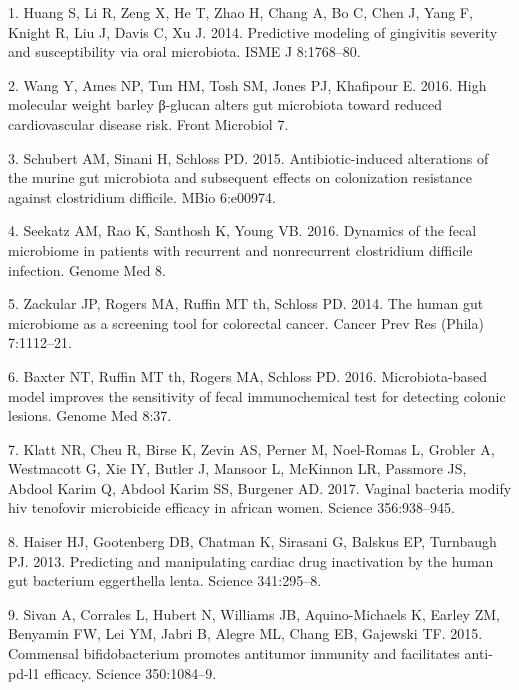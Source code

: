 \documentclass[12pt,]{article}
\begin{document}
\hypertarget{refs}{}
\hypertarget{ref-Huang_gingivitis_2014}{}
1. Huang S, Li R, Zeng X, He T, Zhao H, Chang A, Bo C, Chen J, Yang F,
Knight R, Liu J, Davis C, Xu J. 2014. Predictive modeling of gingivitis
severity and susceptibility via oral microbiota. ISME J 8:1768--80.

\hypertarget{ref-Wang_cvdrisk_2016}{}
2. Wang Y, Ames NP, Tun HM, Tosh SM, Jones PJ, Khafipour E. 2016. High
molecular weight barley β-glucan alters gut microbiota toward reduced
cardiovascular disease risk. Front Microbiol 7.

\hypertarget{ref-Schubert_cdiff_2015}{}
3. Schubert AM, Sinani H, Schloss PD. 2015. Antibiotic-induced
alterations of the murine gut microbiota and subsequent effects on
colonization resistance against clostridium difficile. MBio 6:e00974.

\hypertarget{ref-Seekatz_cdiff_2016}{}
4. Seekatz AM, Rao K, Santhosh K, Young VB. 2016. Dynamics of the fecal
microbiome in patients with recurrent and nonrecurrent clostridium
difficile infection. Genome Med 8.

\hypertarget{ref-zackular_CRC_2014}{}
5. Zackular JP, Rogers MA, Ruffin MT th, Schloss PD. 2014. The human gut
microbiome as a screening tool for colorectal cancer. Cancer Prev Res
(Phila) 7:1112--21.

\hypertarget{ref-baxter_FIT_2016}{}
6. Baxter NT, Ruffin MT th, Rogers MA, Schloss PD. 2016.
Microbiota-based model improves the sensitivity of fecal immunochemical
test for detecting colonic lesions. Genome Med 8:37.

\hypertarget{ref-Klatt_microbicide_2017}{}
7. Klatt NR, Cheu R, Birse K, Zevin AS, Perner M, Noel-Romas L, Grobler
A, Westmacott G, Xie IY, Butler J, Mansoor L, McKinnon LR, Passmore JS,
Abdool Karim Q, Abdool Karim SS, Burgener AD. 2017. Vaginal bacteria
modify hiv tenofovir microbicide efficacy in african women. Science
356:938--945.

\hypertarget{ref-Haiser_cardiac_2013}{}
8. Haiser HJ, Gootenberg DB, Chatman K, Sirasani G, Balskus EP,
Turnbaugh PJ. 2013. Predicting and manipulating cardiac drug
inactivation by the human gut bacterium eggerthella lenta. Science
341:295--8.

\hypertarget{ref-Sivan_cancer_2015}{}
9. Sivan A, Corrales L, Hubert N, Williams JB, Aquino-Michaels K, Earley
ZM, Benyamin FW, Lei YM, Jabri B, Alegre ML, Chang EB, Gajewski TF.
2015. Commensal bifidobacterium promotes antitumor immunity and
facilitates anti-pd-l1 efficacy. Science 350:1084--9.
\end{document}
